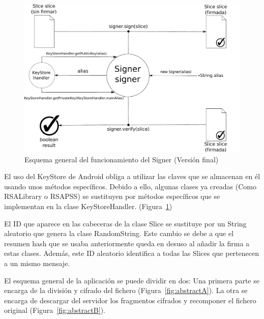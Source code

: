 \begin{figure}[!htb]
  \centering
  \includegraphics[scale=0.5]{Figures/Signer_2}
  \decoRule
  \caption[Signer (Versión final)]{Esquema general del funcionamiento del Signer (Versión final)}
  \label{fig:Signer_2}
\end{figure}

El uso del KeyStore de Android obliga a utilizar las claves que se almacenan en
él usando unos métodos específicos. Debido a ello, algunas clases ya creadas
(Como RSALibrary o RSAPSS) se sustituyen por métodos específicos que se
implementan en la clase KeyStoreHandler. (Figura~\ref{fig:Signer_2})


El ID que aparece en las cabeceras de la clase Slice se sustituye por un String
aleatorio que genera la clase RandomString. Este cambio se debe a que el resumen
hash que se usaba anteriormente queda en desuso al añadir la firma a estas
clases. Además, este ID aleatorio identifica a todas las Slices que pertenecen
a un mismo mensaje.

El esquema general de la aplicación se puede dividir en dos: Una primera parte
se encarga de la división y cifrado del fichero (Figura~\ref{fig:abstractA}). La
otra se encarga de descargar del servidor los fragmentos cifrados y recomponer
el fichero original (Figura~\ref{fig:abstractB}).

